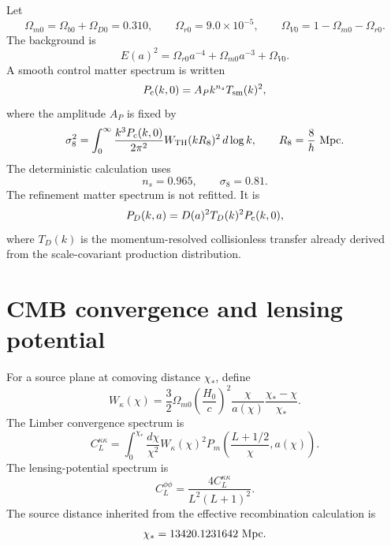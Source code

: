 Let
\begin{equation}
 \Omega_{m0}=\Omega_{b0}+\Omega_{D0}=0.310,
 \qquad
 \Omega_{r0}=9.0\times10^{-5},
 \qquad
 \Omega_{V0}=1-\Omega_{m0}-\Omega_{r0}.
 \label{eq:lens-background-fractions}
\end{equation}
The background is
\begin{equation}
 E(a)^2=\Omega_{r0}a^{-4}+\Omega_{m0}a^{-3}+\Omega_{V0}.
 \label{eq:lens-background}
\end{equation}
A smooth control matter spectrum is written
\begin{equation}
 P_{\rm c}(k,0)=A_P k^{n_s}T_{\rm sm}(k)^2,
 \label{eq:lens-control-power}
\end{equation}
where the amplitude $A_P$ is fixed by
\begin{equation}
 \sigma_8^2
 =\int_0^\infty \frac{k^3P_{\rm c}(k,0)}{2\pi^2}
 W_{\rm TH}(kR_8)^2\,d\log k,
 \qquad
 R_8=\frac{8}{h}\ {\rm Mpc}.
 \label{eq:lens-sigma8-normalization}
\end{equation}
The deterministic calculation uses
\begin{equation}
 n_s=0.965,
 \qquad
 \sigma_8=0.81.
 \label{eq:lens-normalization-values}
\end{equation}
The refinement matter spectrum is not refitted.  It is
\begin{equation}
 P_D(k,a)=D(a)^2T_D(k)^2P_{\rm c}(k,0),
 \label{eq:lens-refinement-power}
\end{equation}
where $T_D(k)$ is the momentum-resolved collisionless transfer already derived from the scale-covariant production distribution.

\section{CMB convergence and lensing potential}

For a source plane at comoving distance $\chi_*$, define
\begin{equation}
 W_\kappa(\chi)
 =\frac{3}{2}\Omega_{m0}\left(\frac{H_0}{c}\right)^2
 \frac{\chi}{a(\chi)}\frac{\chi_*-\chi}{\chi_*}.
 \label{eq:lens-kernel}
\end{equation}
The Limber convergence spectrum is
\begin{equation}
 C_L^{\kappa\kappa}
 =\int_0^{\chi_*}\frac{d\chi}{\chi^2}
 W_\kappa(\chi)^2
 P_m\!\left(\frac{L+1/2}{\chi},a(\chi)\right).
 \label{eq:lens-kappa-spectrum}
\end{equation}
The lensing-potential spectrum is
\begin{equation}
 C_L^{\phi\phi}
 =\frac{4C_L^{\kappa\kappa}}{L^2(L+1)^2}.
 \label{eq:lens-phi-spectrum}
\end{equation}
The source distance inherited from the effective recombination calculation is
\begin{equation}
 \chi_*=13420.1231642\ {\rm Mpc}.
 \label{eq:lens-source-distance}
\end{equation}

